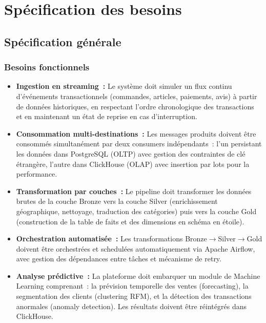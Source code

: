 \chapter{Spécification des besoins}

\section{Spécification générale}

\subsection{Besoins fonctionnels}

\begin{itemize}
\renewcommand{\labelitemi}{$\bullet$}
  \setlength{\itemsep}{0.4em}

\item \textbf{Ingestion en streaming~:} Le système doit simuler un flux continu d'événements transactionnels (commandes, articles, paiements, avis) à partir de données historiques, en respectant l'ordre chronologique des transactions et en maintenant un état de reprise en cas d'interruption.

\item \textbf{Consommation multi-destinations~:} Les messages produits doivent être consommés simultanément par deux consumers indépendants~: l'un persistant les données dans PostgreSQL (OLTP) avec gestion des contraintes de clé étrangère, l'autre dans ClickHouse (OLAP) avec insertion par lots pour la performance.

\item \textbf{Transformation par couches~:} Le pipeline doit transformer les données brutes de la couche Bronze vers la couche Silver (enrichissement géographique, nettoyage, traduction des catégories) puis vers la couche Gold (construction de la table de faits et des dimensions en schéma en étoile).

\item \textbf{Orchestration automatisée~:} Les transformations Bronze$\rightarrow$Silver$\rightarrow$Gold doivent être orchestrées et schedulées automatiquement via Apache Airflow, avec gestion des dépendances entre tâches et mécanisme de retry.

\item \textbf{Analyse prédictive~:} La plateforme doit embarquer un module de Machine Learning comprenant~: la prévision temporelle des ventes (forecasting), la segmentation des clients (clustering RFM), et la détection des transactions anormales (anomaly detection). Les résultats doivent être réintégrés dans ClickHouse.


\end{itemize}
